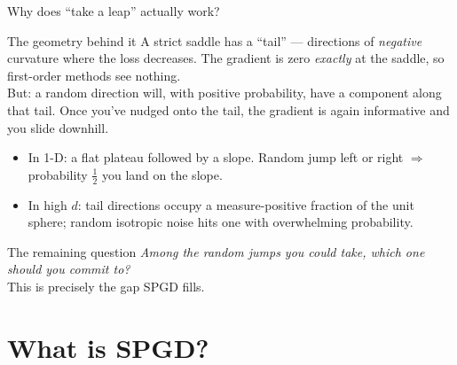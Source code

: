 \documentclass[11pt,aspectratio=169]{beamer}
\begin{document}
\begin{frame}{Why does ``take a leap'' actually work?}
  \begin{block}{The geometry behind it}
    \footnotesize
    A strict saddle has a ``tail'' --- directions of \emph{negative}
    curvature where the loss decreases. The gradient is zero
    \emph{exactly} at the saddle, so first-order methods see
    nothing.\\[0.4em]
    But: \alert{a random direction will, with positive probability,
    have a component along that tail}. Once you've nudged
    onto the tail, the gradient is again informative and you slide
    downhill.
  \end{block}
  \vspace{0.4em}
  \begin{itemize}\setlength\itemsep{0.3em}
    \item In 1-D: a flat plateau followed by a slope. Random jump
          left or right $\Rightarrow$ probability $\tfrac{1}{2}$
          you land on the slope.
    \item In high $d$: tail directions occupy a measure-positive
          fraction of the unit sphere; random isotropic noise hits
          one with overwhelming probability.
  \end{itemize}
  \vspace{0.4em}
  \pause
  \begin{block}{The remaining question}
    \centering
    \emph{Among the random jumps you could take, which one should
          you commit to?}\\
    \alert{This is precisely the gap SPGD fills.}
  \end{block}
\end{frame}


\section{What is SPGD?}
\end{document}
